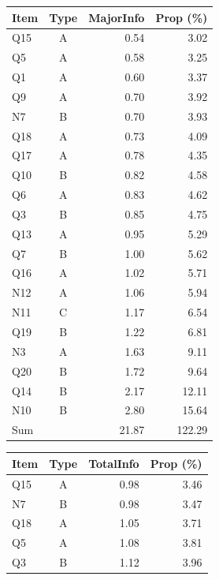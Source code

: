 \documentclass[a4paper]{report}
\begin{document}
\begin{table}[ht]
  \begin{minipage}{0.5\linewidth}
      \centering
      \begin{tabular}{lcrr}
        \hline
      Item & Type & MajorInfo & Prop (\%) \\ 
      \hline
      Q15 & A & 0.54 & 3.02 \\ 
        Q5 & A & 0.58 & 3.25 \\ 
        Q1 & A & 0.60 & 3.37 \\ 
        Q9 & A & 0.70 & 3.92 \\ 
        N7 & B & 0.70 & 3.93 \\ 
        Q18 & A & 0.73 & 4.09 \\ 
        Q17 & A & 0.78 & 4.35 \\ 
        Q10 & B & 0.82 & 4.58 \\ 
        Q6 & A & 0.83 & 4.62 \\ 
        Q3 & B & 0.85 & 4.75 \\ 
        Q13 & A & 0.95 & 5.29 \\ 
        Q7 & B & 1.00 & 5.62 \\ 
        Q16 & A & 1.02 & 5.71 \\ 
        N12 & A & 1.06 & 5.94 \\ 
        N11 & C & 1.17 & 6.54 \\ 
        Q19 & B & 1.22 & 6.81 \\ 
        N3 & A & 1.63 & 9.11 \\ 
        Q20 & B & 1.72 & 9.64 \\ 
        Q14 & B & 2.17 & 12.11 \\ 
        N10 & B & 2.80 & 15.64 \\ 
        \hline
        Sum & & 21.87 & 122.29 \\
         \hline
      \end{tabular}
  \end{minipage}%
  \begin{minipage}{0.5\linewidth}
    \centering
    \begin{tabular}{lcrr}
      \hline
    Item & Type & TotalInfo & Prop (\%) \\ 
    \hline
    Q15 & A & 0.98 & 3.46 \\ 
      N7 & B & 0.98 & 3.47 \\ 
      Q18 & A & 1.05 & 3.71 \\ 
      Q5 & A & 1.08 & 3.81 \\ 
      Q3 & B & 1.12 & 3.96 \\ 

\end{tabular}
\end{minipage}
\end{table}
\end{document}

